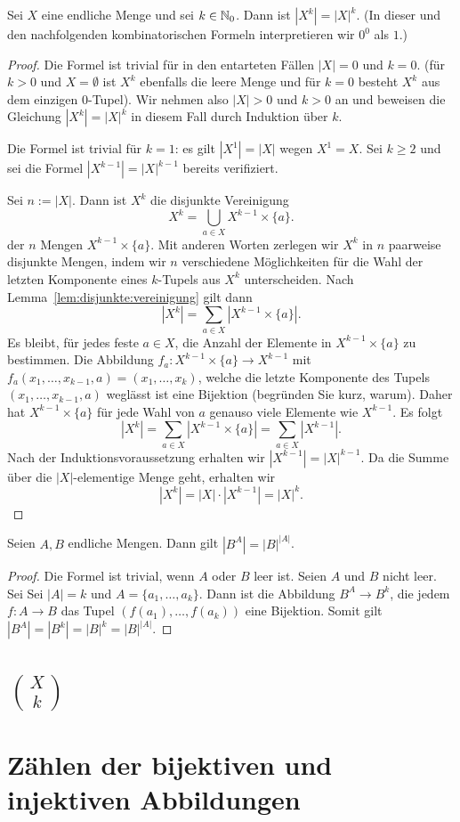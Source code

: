 \begin{thm}
	Sei $X$ eine endliche Menge und sei $k \in \mathbb{N}_0$. Dann ist $|X^k| = |X|^k$. (In dieser und den nachfolgenden kombinatorischen Formeln interpretieren wir $0^0$ als $1$.)
\end{thm} 
\begin{proof} 
	Die Formel ist trivial für in den entarteten Fällen $|X|=0$ und $k=0$.
	(für $k>0$ und $X = \emptyset$ ist $X^k$ ebenfalls die leere Menge und für $k=0$  besteht $X^k$ aus dem einzigen $0$-Tupel).  Wir nehmen also $|X| >0$ und $k>0$ an und beweisen  die Gleichung $|X^k| = |X|^k$  in diesem Fall durch Induktion über $k$. 
	
	Die Formel ist trivial für $k = 1$: es gilt $|X^1| = |X|$ wegen $X^1 = X$. Sei $k \ge 2$ und sei die Formel $|X^{k-1}| = |X|^{k-1}$ bereits verifiziert. 
	
	Sei $n:=|X|$. Dann ist $X^k$ die disjunkte Vereinigung 
	\[
			X^k = \bigcup_{a \in X} X^{k-1} \times \{a\}. 
	\]
	der $n$ Mengen $X^{k-1} \times \{a\}$. Mit anderen Worten zerlegen wir $X^k$ in $n$ paarweise disjunkte Mengen, indem wir $n$ verschiedene Möglichkeiten für die Wahl der letzten Komponente eines $k$-Tupels aus $X^k$ unterscheiden. Nach Lemma~\ref{lem:disjunkte:vereinigung} gilt dann 
	\[
			|X^k| = \sum_{a \in X} |X^{k-1} \times \{a\}|. 
	\]
	Es bleibt, für jedes feste $a \in X$, die Anzahl der Elemente in $X^{k-1} \times \{a\}$ zu bestimmen. Die Abbildung 
	$f_a : X^{k-1} \times \{a\} \to X^{k-1}$ mit $f_a(x_1,\ldots,x_{k-1},a) = (x_1,\ldots,x_k)$, welche die letzte Komponente des Tupels $(x_1,\ldots,x_{k-1},a)$ weglässt ist eine Bijektion (begründen Sie kurz, warum). Daher hat $X^{k-1} \times \{a\}$ für jede Wahl von $a$ genauso viele Elemente wie $X^{k-1}$. Es folgt 
	\[
			|X^k| = \sum_{a \in X} |X^{k-1} \times \{a\}| = \sum_{a \in X} |X^{k-1}|. 
	\]
	Nach der Induktionsvoraussetzung erhalten wir $|X^{k-1}| = |X|^{k-1}$. Da die Summe über die $|X|$-elementige Menge geht, erhalten wir 
	\[
			|X^k| = |X| \cdot |X^{k-1}| = |X|^k. 
	\]
\end{proof} 


\begin{thm}
	Seien $A,B $ endliche Mengen. Dann gilt $|B^A| = |B|^{|A|}$. 
\end{thm}
\begin{proof}
	Die Formel ist trivial, wenn $A$ oder $B$ leer ist. Seien $A$ und $B$ nicht leer. Sei Sei $|A| = k$ und $A = \{a_1,\ldots,a_k\}$. Dann ist die Abbildung $B^A \to B^k$, die jedem $f : A \to B$ das Tupel $(f(a_1),\ldots,f(a_k))$ eine Bijektion. Somit gilt 
	$|B^A | = |B^k| = |B|^k = |B|^{|A|}$.  
\end{proof} 

\section{$\binom{X}{k}$}

\section{Zählen der bijektiven und injektiven Abbildungen} 